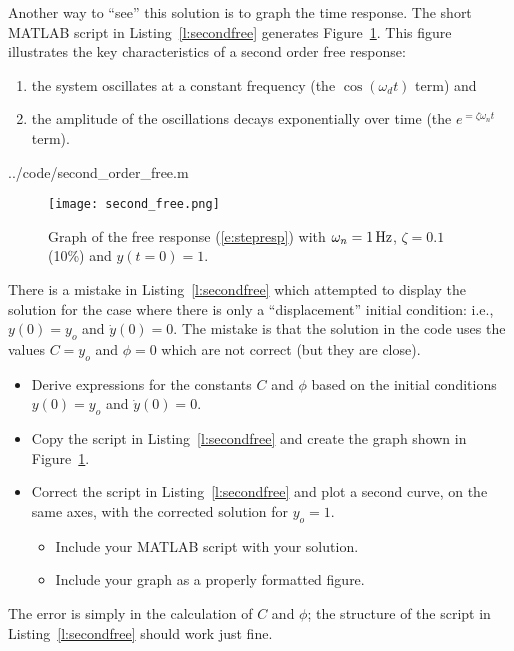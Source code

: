 Another way to ``see'' this solution is to graph the time response.  The short MATLAB script in Listing~\ref{l:secondfree} generates Figure~\ref{f:secondfree}.  This figure illustrates the key characteristics of a second order free response:
\begin{enumerate}
\item the system oscillates at a constant frequency (the $\cos(\omega_d t)$ term) and
\item the amplitude of the oscillations decays exponentially over time (the $e^{=\zeta \omega_n t}$ term).
\end{enumerate}
%


{../code/second_order_free.m}


\begin{figure}[hbt]
\centering
\texttt{[image: second\_free.png]}
\caption{Graph of the free response (\ref{e:stepresp}) with $\omega_n= \unit[1]{Hz}$, $\zeta=0.1$ (10\%) and $y(t=0)=1$.}
\label{f:secondfree}
\end{figure}

\begin{ex}
There is a mistake in Listing~\ref{l:secondfree} which attempted to display the solution for the case where there is only a ``displacement'' initial condition: i.e., $y(0)=y_o$ and $\dot{y}(0)=0$.  The mistake is that the solution in the code uses the values $C=y_o$ and $\phi=0$ which are not correct (but they are close). 
\begin{itemize}\label{ex:secondresp}
\item Derive expressions for the constants $C$ and $\phi$ based on the initial conditions $y(0)=y_o$ and $\dot{y}(0)=0$.
\item Copy the script in Listing~\ref{l:secondfree} and create the graph shown in Figure~\ref{f:secondfree}.
\item Correct the script in Listing~\ref{l:secondfree} and plot a second curve, on the same axes, with the corrected solution for $y_o=1$.  
  \begin{itemize}
  \item Include your MATLAB script with your solution.
  \item Include your graph as a properly formatted figure.
  \end{itemize}
\end{itemize}
The error is simply in the calculation of $C$ and $\phi$; the structure of the script in Listing~\ref{l:secondfree} should work just fine.
\end{ex}

